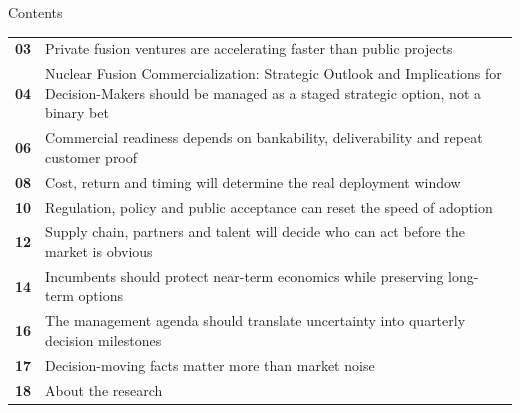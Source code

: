 \documentclass[10pt,a4paper]{article}
\begin{document}
\clearpage
{\sffamily\fontsize{26}{31}\selectfont\color{BONavy} Contents}\par\vspace{10pt}
\begin{tabularx}{\linewidth}{p{14mm}Y}
\textcolor{BOGreen}{\bfseries 03} & Private fusion ventures are accelerating faster than public projects \\[5pt]
\textcolor{BOGreen}{\bfseries 04} & Nuclear Fusion Commercialization: Strategic Outlook and Implications for Decision-Makers should be managed as a staged strategic option, not a binary bet \\[5pt]
\textcolor{BOGreen}{\bfseries 06} & Commercial readiness depends on bankability, deliverability and repeat customer proof \\[5pt]
\textcolor{BOGreen}{\bfseries 08} & Cost, return and timing will determine the real deployment window \\[5pt]
\textcolor{BOGreen}{\bfseries 10} & Regulation, policy and public acceptance can reset the speed of adoption \\[5pt]
\textcolor{BOGreen}{\bfseries 12} & Supply chain, partners and talent will decide who can act before the market is obvious \\[5pt]
\textcolor{BOGreen}{\bfseries 14} & Incumbents should protect near-term economics while preserving long-term options \\[5pt]
\textcolor{BOGreen}{\bfseries 16} & The management agenda should translate uncertainty into quarterly decision milestones \\[5pt]
\textcolor{BOGreen}{\bfseries 17} & Decision-moving facts matter more than market noise \\[5pt]
\textcolor{BOGreen}{\bfseries 18} & About the research \\[5pt]
\end{tabularx}
\clearpage
\end{document}
